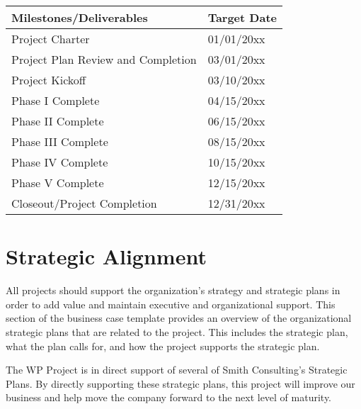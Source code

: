 \documentclass[11pt]{article}
\begin{document}
\begin{center}
\begin{tabular}{ll}
Milestones/Deliverables & Target Date\\
\hline
Project Charter & 01/01/20xx\\
Project Plan Review and Completion & 03/01/20xx\\
Project Kickoff & 03/10/20xx\\
Phase I Complete & 04/15/20xx\\
Phase II Complete & 06/15/20xx\\
Phase III Complete & 08/15/20xx\\
Phase IV Complete & 10/15/20xx\\
Phase V Complete & 12/15/20xx\\
Closeout/Project Completion & 12/31/20xx\\
\end{tabular}
\end{center}

\section{Strategic Alignment}
\label{sec:orgc1b6852}
All projects should support the organization’s strategy and strategic plans in order to add value and maintain executive and organizational support. This section of the business case template provides an overview of the organizational strategic plans that are related to the project. This includes the strategic plan, what the plan calls for, and how the project supports the strategic plan.

The WP Project is in direct support of several of Smith Consulting’s Strategic Plans. By directly supporting these strategic plans, this project will improve our business and help move the company forward to the next level of maturity.
\end{document}
